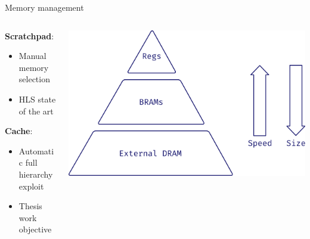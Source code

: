 \documentclass[aspectratio=169]{beamer}
\begin{document}
\begin{frame}{Memory management}
	\begin{columns}
		\begin{column}{.5\textwidth}
			\textbf{Scratchpad}:
			\begin{itemize}
				\item Manual memory selection
				\item HLS state of the art
			\end{itemize}

			\bigskip

			\textbf{Cache}:
			\begin{itemize}
				\item Automatic full hierarchy exploit
				\item<alert@+> Thesis work objective
			\end{itemize}
		\end{column}
		\begin{column}{.5\textwidth}
			\begin{center}
				\includegraphics[width=.9\textwidth]{mem_hierarchy}
			\end{center}
		\end{column}
	\end{columns}
\end{frame}
\end{document}

